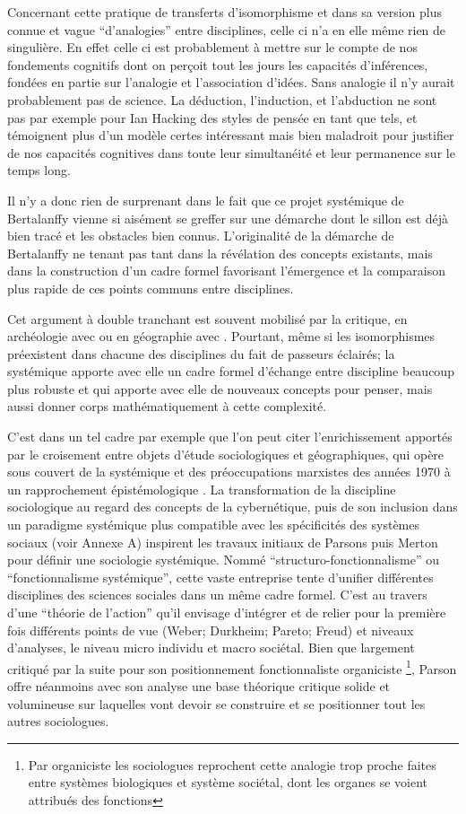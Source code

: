 Concernant cette pratique de transferts d'isomorphisme et dans sa version plus connue et vague \enquote{d'analogies} entre disciplines, celle ci n'a en elle même rien de singulière. En effet celle ci est probablement à mettre sur le compte de nos fondements cognitifs dont on perçoit tout les jours les capacités d'inférences, fondées en partie sur l’analogie et l'association d'idées. Sans analogie il n'y aurait probablement pas de science. La déduction, l'induction, et l'abduction ne sont pas par exemple pour Ian Hacking des styles de pensée en tant que tels, et témoignent plus d'un modèle certes intéressant mais bien maladroit pour justifier de nos capacités cognitives dans toute leur simultanéité et leur permanence sur le temps long.

Il n'y a donc rien de surprenant dans le fait que ce projet systémique de Bertalanffy vienne si aisément se greffer sur une démarche dont le sillon est déjà bien tracé et les obstacles bien connus. L'originalité de la démarche de Bertalanffy ne tenant pas tant dans la révélation des concepts existants, mais dans la construction d'un cadre formel favorisant l'émergence et la comparaison plus rapide de ces points communs entre disciplines. 

Cet argument à double tranchant est souvent mobilisé par la critique, en archéologie avec \textcite{Salmon1978} ou en géographie avec \textcite{Chisholm1967}. Pourtant, même si les isomorphismes préexistent dans chacune des disciplines du fait de passeurs éclairés; la systémique apporte avec elle un cadre formel d'échange entre discipline beaucoup plus robuste et qui apporte avec elle de nouveaux concepts pour penser, mais aussi donner corps mathématiquement à cette complexité.

C'est dans un tel cadre par exemple que l'on peut citer l'enrichissement apportés par le croisement entre objets d'étude sociologiques et géographiques, qui opère sous couvert de la systémique et des préoccupations marxistes des années 1970 à un rapprochement épistémologique \autocite{Claval1995}. La transformation de la discipline sociologique au regard des concepts de la cybernétique, puis de son inclusion dans un paradigme systémique plus compatible avec les spécificités des systèmes sociaux (voir Annexe A) inspirent les travaux initiaux de Parsons puis Merton pour définir une sociologie systémique. Nommé \enquote{structuro-fonctionnalisme} ou \enquote{fonctionnalisme systémique}, cette vaste entreprise tente d'unifier différentes disciplines des sciences sociales dans un même cadre formel. C'est au travers d'une \enquote{théorie de l'action}  qu'il envisage d'intégrer et de relier pour la première fois différents points de vue (Weber; Durkheim; Pareto; Freud) et niveaux d'analyses, le niveau micro individu et macro sociétal. Bien que largement critiqué par la suite pour son positionnement fonctionnaliste organiciste \footnote{Par organiciste les sociologues reprochent cette analogie trop proche faites entre systèmes biologiques et système sociétal, dont les organes se voient attribués des fonctions}, Parson offre néanmoins avec son analyse une base théorique critique solide et volumineuse sur laquelles vont devoir se construire et se positionner tout les autres sociologues. 

